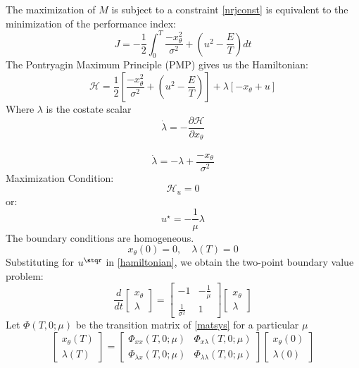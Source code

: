 \documentclass[a4paper]{article}
\begin{document}
The maximization of \( M \) is subject to a constraint \eqref{nrjconst} is equivalent to the minimization of the performance index:
\begin{equation}
J = -\frac{1}{2} \int_0^T \dfrac{-x_\theta^2}{\sigma^2} + (u^2 - \dfrac{E}{T} )dt
\end{equation}
The Pontryagin Maximum Principle (PMP) gives us the Hamiltonian:
\begin{equation}
\mathcal{H} = \dfrac{1}{2} \left[\dfrac{-x_\theta^2}{\sigma^2} + (u^2 - \dfrac{E}{T} )\right] + \lambda[-x_\theta + u]
\label{hamiltonian}
\end{equation}
Where $\lambda$ is the costate scalar\\
\[
    \dot{\lambda} = -\dfrac{\partial \mathcal{H}}{\partial x_\theta}
\]
\\
\begin{equation}
    \dot{\lambda} = -\lambda + \dfrac{-x_\theta}{\sigma^2}
    \label{labdadot}
\end{equation}
Maximization Condition:
\[\mathcal{H}_u=0\]
or:
\begin{equation}
    u^\star = - \dfrac{1}{\mu}\lambda
\end{equation}
The boundary conditions are homogeneous.
\[
x_\theta(0)=0,\quad \lambda(T)=0
\]
Substituting for $u^\stqr$ in \eqref{hamiltonian}, we obtain the two-point boundary value problem:
\begin{equation}
    \frac{d}{dt} \left[ \begin{array}{c} x_\theta \\ \lambda \end{array} \right]
= \left[ \begin{array}{cc} -1 & -\frac{1}{\mu} \\ \frac{1}{\sigma^2} & 1 \end{array} \right]
\left[ \begin{array}{c} x_\theta \\ \lambda \end{array} \right]
\label{matsys}
\end{equation}
Let $\Phi(T,0;\mu)$ be the transition matrix of \eqref{matsys} for a particular $\mu$
\begin{equation}
     \left[ \begin{array}{c} x_\theta(T) \\ \lambda(T) \end{array} \right]
= \left[ \begin{array}{cc} \Phi_{xx}(T,0;\mu) & \Phi_{x\lambda}(T,0;\mu) \\ \Phi_{\lambda x}(T,0;\mu) & \Phi_{\lambda\lambda}(T,0;\mu) \end{array} \right]
\left[ \begin{array}{c} x_\theta(0) \\ \lambda(0) \end{array} \right]
\label{matexp}
\end{equation}
\end{document}
